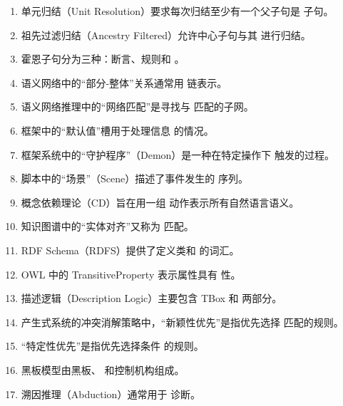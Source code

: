 \begin{enumerate}[resume,leftmargin=2em,itemsep=1pt]
\item 单元归结（Unit Resolution）要求每次归结至少有一个父子句是 \underline{\hspace{3em}} 子句。
\item 祖先过滤归结（Ancestry Filtered）允许中心子句与其 \underline{\hspace{3em}} 进行归结。
\item 霍恩子句分为三种：断言、规则和 \underline{\hspace{3em}}。
\item 语义网络中的“部分-整体”关系通常用 \underline{\hspace{3em}} 链表示。
\item 语义网络推理中的“网络匹配”是寻找与 \underline{\hspace{3em}} 匹配的子网。
\item 框架中的“默认值”槽用于处理信息 \underline{\hspace{3em}} 的情况。
\item 框架系统中的“守护程序”（Demon）是一种在特定操作下 \underline{\hspace{3em}} 触发的过程。
\item 脚本中的“场景”（Scene）描述了事件发生的 \underline{\hspace{3em}} 序列。
\item 概念依赖理论（CD）旨在用一组 \underline{\hspace{3em}} 动作表示所有自然语言语义。
\item 知识图谱中的“实体对齐”又称为 \underline{\hspace{3em}} 匹配。
\item RDF Schema（RDFS）提供了定义类和 \underline{\hspace{3em}} 的词汇。
\item OWL 中的 TransitiveProperty 表示属性具有 \underline{\hspace{3em}} 性。
\item 描述逻辑（Description Logic）主要包含 TBox 和 \underline{\hspace{3em}} 两部分。
\item 产生式系统的冲突消解策略中，“新颖性优先”是指优先选择 \underline{\hspace{3em}} 匹配的规则。
\item “特定性优先”是指优先选择条件 \underline{\hspace{3em}} 的规则。
\item 黑板模型由黑板、\underline{\hspace{3em}} 和控制机构组成。
\item 溯因推理（Abduction）通常用于 \underline{\hspace{3em}} 诊断。

\end{enumerate}
